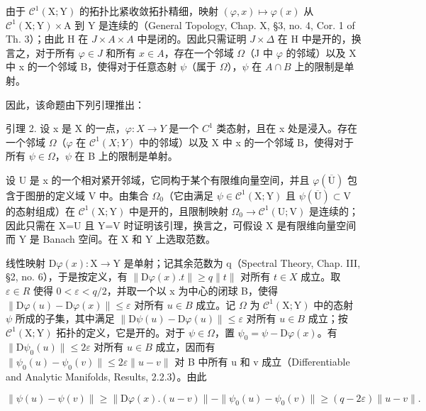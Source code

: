 由于 \(\mathcal{C}^{1}(\mathrm{X};\mathrm{Y})\) 的拓扑比紧收敛拓扑精细，映射 \((\varphi,x)\mapsto\varphi(x)\) 从 \(\mathcal{C}^{1}(\mathrm{X};\mathrm{Y})\times\mathrm{A}\) 到 Y 是连续的（General Topology, Chap. X, §3, no. 4, Cor. 1 of Th. 3）；由此 H 在 \(J\times A\times A\) 中是闭的。因此只需证明 \(J\times\Delta\) 在 H 中是开的，换言之，对于所有 \(\varphi\in J\) 和所有 \(x\in A\)，存在一个邻域 \(\Omega\)（J 中 \(\varphi\) 的邻域）以及 X 中 x 的一个邻域 B，使得对于任意态射 \(\psi\)（属于 \(\Omega\)），\(\psi\) 在 \(A\cap B\) 上的限制是单射。

因此，该命题由下列引理推出：

引理 2. 设 x 是 X 的一点，\(\varphi: X \to Y\) 是一个 \(C^{1}\) 类态射，且在 x 处是浸入。存在一个邻域 \(\Omega\)（\(\varphi\) 在 \(\mathcal{C}^{1}(X;Y)\) 中的邻域）以及 X 中 x 的一个邻域 B，使得对于所有 \(\psi \in \Omega\)，\(\psi\) 在 B 上的限制是单射。

设 U 是 x 的一个相对紧开邻域，它同构于某个有限维向量空间，并且 \(\varphi(\overline{\mathrm{U}})\) 包含于图册的定义域 V 中。由集合 \(\Omega_{0}\)（它由满足 \(\psi\in\mathcal{C}^{1}(\mathrm{X};\mathrm{Y})\) 且 \(\psi(\overline{\mathrm{U}})\subset\mathrm{V}\) 的态射组成）在 \(\mathcal{C}^{1}(\mathrm{X};\mathrm{Y})\) 中是开的，且限制映射 \(\Omega_{0}\to\mathcal{C}^{1}(\mathrm{U};\mathrm{V})\) 是连续的；因此只需在 X=U 且 Y=V 时证明该引理，换言之，可假设 X 是有限维向量空间而 Y 是 Banach 空间。在 X 和 Y 上选取范数。

线性映射 \(\mathrm{D}\varphi(x):\mathrm{X}\to\mathrm{Y}\) 是单射；记其余范数为 q（Spectral Theory, Chap. III, §2, no. 6），于是按定义，有 \(\|\mathrm{D}\varphi(x).t\|\geq q\|t\|\) 对所有 \(t\in X\) 成立。取 \(\varepsilon\in R\) 使得 \(0<\varepsilon<q/2\)，并取一个以 x 为中心的闭球 B，使得 \(\|\mathrm{D}\varphi(u)-\mathrm{D}\varphi(x)\|\leq\varepsilon\) 对所有 \(u\in B\) 成立。记 \(\Omega\) 为 \(\mathcal{C}^{1}(\mathrm{X};\mathrm{Y})\) 中的态射 \(\psi\) 所成的子集，其中满足 \(\|\mathrm{D}\psi(u)-\mathrm{D}\varphi(u)\|\leq\varepsilon\) 对所有 \(u\in B\) 成立；按 \(\mathcal{C}^{1}(\mathrm{X};\mathrm{Y})\) 拓扑的定义，它是开的。对于 \(\psi\in\Omega\)，置 \(\psi_{0}=\psi-\mathrm{D}\varphi(x)\)。有 \(\|\mathrm{D}\psi_{0}(u)\|\leq2\varepsilon\) 对所有 \(u\in B\) 成立，因而有 \(\|\psi_{0}(u)-\psi_{0}(v)\|\leq2\varepsilon\|u-v\|\) 对 B 中所有 u 和 v 成立（Differentiable and Analytic Manifolds, Results, 2.2.3）。由此

\[
\| \psi (u) - \psi (v) \| \geq \| \mathrm{D} \varphi (x). (u - v) \| - \| \psi_ {0} (u) - \psi_ {0} (v) \| \geq (q - 2 \varepsilon) \| u - v \|.
\]

